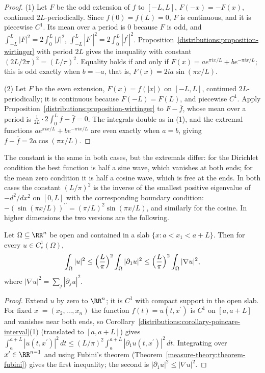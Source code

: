 \begin{proof}
(1) Let $F$ be the odd extension of $f$ to $[-L, L]$, $F(-x) = -F(x)$, continued $2L$-periodically. Since $f(0) = f(L) = 0$, $F$ is continuous, and it is piecewise $C^1$. Its mean over a
period is $0$ because $F$ is odd, and $\int_{-L}^L|F|^2 = 2\int_0^L|f|^2$, $\int_{-L}^L|F^{\prime}|^2 = 2\int_0^L|f^{\prime}|^2$. Proposition~\ref{distributions:proposition-wirtinger} with period $2L$ gives
the inequality with constant $(2L/2\pi)^2 = (L/\pi)^2$. Equality holds if and only if $F(x) = ae^{\pi ix/L} + be^{-\pi ix/L}$; this is odd exactly when $b = -a$, that is, $F(x) = 2ia\sin(\pi x/L)$.

(2) Let $F$ be the even extension, $F(x) = f(|x|)$ on $[-L, L]$, continued $2L$-periodically; it is continuous because $F(-L) = F(L)$, and piecewise $C^1$. Apply
Proposition~\ref{distributions:proposition-wirtinger} to $F - \bar f$, whose mean over a period is $\frac{1}{2L}\cdot 2\int_0^Lf - \bar f = 0$. The integrals double as in (1), and the extremal functions
$ae^{\pi ix/L} + be^{-\pi ix/L}$ are even exactly when $a = b$, giving $f - \bar f = 2a\cos(\pi x/L)$.
\end{proof}

The constant is the same in both cases, but the extremals differ: for the Dirichlet condition the best function is half a sine wave, which vanishes at both ends; for the mean zero condition it
is half a cosine wave, which is free at the ends. In both cases the constant $(L/\pi)^2$ is the inverse of the smallest positive eigenvalue of $-d^2/dx^2$ on $[0, L]$ with the corresponding
boundary condition: $-(\sin(\pi x/L))^{\prime\prime} = (\pi/L)^2\sin(\pi x/L)$, and similarly for the cosine. In higher dimensions the two versions are the following.

\begin{theorem}\label{distributions:theorem-poincare-dirichlet}
Let $\Omega \subseteq \RR^n$ be open and contained in a slab $\{x : a < x_1 < a + L\}$. Then for every $u \in C^1_c(\Omega)$,
\[
\int_\Omega|u|^2 \leq \Bigl(\frac{L}{\pi}\Bigr)^2\int_\Omega|\partial_1u|^2 \leq \Bigl(\frac{L}{\pi}\Bigr)^2\int_\Omega|\nabla u|^2,
\]
where $|\nabla u|^2 = \sum_j|\partial_ju|^2$.
\end{theorem}

\begin{proof}
Extend $u$ by zero to $\RR^n$; it is $C^1$ with compact support in the open slab. For fixed $x^{\prime} = (x_2, \ldots, x_n)$ the function $f(t) = u(t, x^{\prime})$ is $C^1$ on $[a, a + L]$ and vanishes
near both ends, so Corollary~\ref{distributions:corollary-poincare-interval}(1) (translated to $[a, a + L]$) gives $\int_a^{a+L}|u(t, x^{\prime})|^2\,dt \leq (L/\pi)^2\int_a^{a+L}|\partial_1u(t, x^{\prime})|^2\,dt$.
Integrating over $x^{\prime} \in \RR^{n-1}$ and using Fubini's theorem (Theorem~\ref{measure-theory:theorem-fubini}) gives the first inequality; the second is $|\partial_1u|^2 \leq |\nabla u|^2$.
\end{proof}

